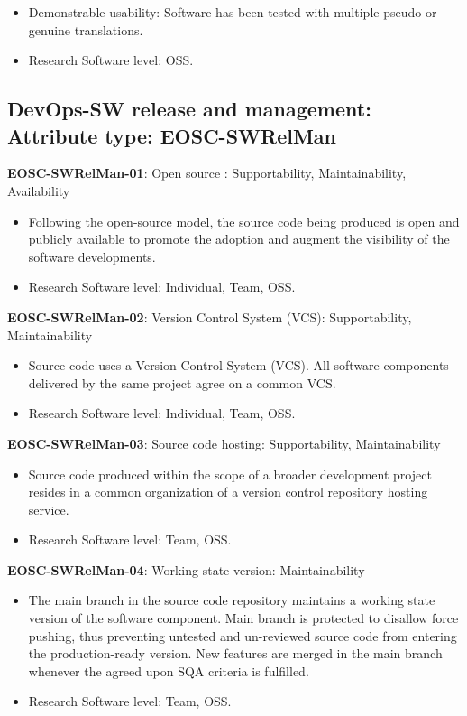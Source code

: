 \begin{itemize}
    \item Demonstrable usability: Software has been tested with multiple pseudo or genuine translations. \cite{shepherdson_cessda_2019}
    \item Research Software level: OSS.
\end{itemize}

\subsection{DevOps-SW release and management: Attribute type: EOSC-SWRelMan}

\textbf{EOSC-SWRelMan-01}: Open source : Supportability, Maintainability, Availability

\begin{itemize}
    \item Following the open-source model, the source code being produced is open and publicly available to promote the adoption and augment the visibility of the software developments. \cite{orviz_set_2017,raymond_software_2013}
    \item Research Software level: Individual, Team, OSS.
\end{itemize}

\textbf{EOSC-SWRelMan-02}: Version Control System (VCS): Supportability, Maintainability

\begin{itemize}
    \item Source code uses a Version Control System (VCS). All software components delivered by the same project agree on a common VCS. \cite{orviz_set_2017}
    \item Research Software level: Individual, Team, OSS.
\end{itemize}

\textbf{EOSC-SWRelMan-03}: Source code hosting: Supportability, Maintainability

\begin{itemize}
    \item Source code produced within the scope of a broader development project resides in a common organization of a version control repository hosting service. \cite{orviz_set_2017}
    \item Research Software level: Team, OSS.
\end{itemize}

\textbf{EOSC-SWRelMan-04}: Working state version: Maintainability

\begin{itemize}
    \item The main branch in the source code repository maintains a working state version of the software component. Main branch is protected to disallow force pushing, thus preventing untested and un-reviewed source code from entering the production-ready version. New features are merged in the main branch whenever the agreed upon SQA criteria is fulfilled. \cite{orviz_set_2017}
    \item Research Software level: Team, OSS.
\end{itemize}

